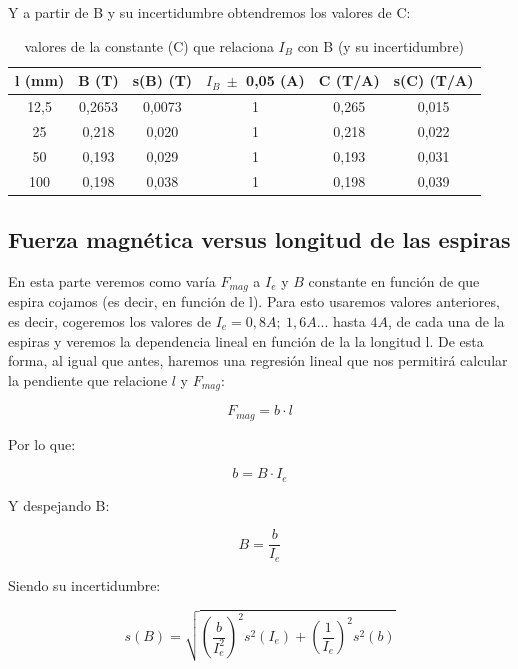\documentclass[12pt,a4paper]{book}
\begin{document}
Y a partir de B y su incertidumbre obtendremos los valores de C:

\begin{table}[h!]
\begin{center}
\begin{tabular}{|c|c|c|c|c|c|}
\hline
l (mm) & 	 B   (T) & 	 s(B)   (T) & 	 $ I_B \ \pm$ 0,05 (A) & 	 C (T/A) & 	 s(C) (T/A) \\  \hline
12,5 & 	 0,2653 & 	 0,0073 & 	 1 & 	 0,265 & 	 0,015 \\ 
25 & 	 0,218 & 	 0,020 & 	 1 & 	 0,218 & 	 0,022 \\ 
50 & 	 0,193 & 	 0,029 & 	 1 & 	 0,193 & 	 0,031 \\ 
100 & 	 0,198 & 	 0,038 & 	 1 & 	 0,198 & 	 0,039 \\ 
\hline
\end{tabular}
\end{center}
\caption{valores de la constante (C) que relaciona $I_B$ con B (y su incertidumbre)}
\label{Tab:balanza-valor-cte-Ie}
\end{table}

\newpage


\subsection{Fuerza magnética versus longitud de las espiras}
En esta parte veremos como varía $F_{mag}$ a $I_e$ y $B$ constante en función de que espira cojamos (es decir, en función de l). Para esto usaremos valores anteriores, es decir, cogeremos los valores de $I_e=0,8A; \ 1,6A...$ hasta $4A$, de cada una de la espiras y veremos la dependencia lineal en función de la la longitud l. De esta forma, al igual que antes, haremos una regresión lineal que nos permitirá calcular la pendiente que relacione $l$ y $F_{mag}$:

$$ F_{mag} = b \cdot l  $$

Por lo que:

$$ b = B \cdot I_e $$

Y despejando B:

\begin{equation}
B=\dfrac{b}{I_e}
\label{Ec: valor de cte con l constante balanza electrodinamica}
\end{equation}

Siendo su incertidumbre:

\begin{equation}
s(B)=\sqrt{(\dfrac{b}{I_e^2})^2s^2(I_e)+(\dfrac{1}{I_e})^2s^2(b)}
\label{Ec: incertidumbre de cte con l constante balanza electrodnamica}
\end{equation}
\end{document}
